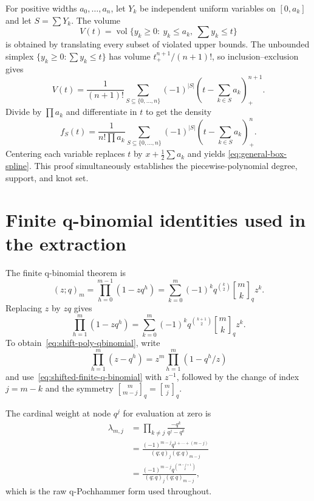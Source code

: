 \documentclass[11pt,a4paper]{article}
\theoremstyle{remark}
\newcommand{\qbinom}[3]{\genfrac{[}{]}{0pt}{}{#1}{#2}_{#3}}
\begin{document}
For positive widths $a_0,\ldots,a_n$, let $Y_k$ be independent uniform
variables on $[0,a_k]$ and let $S=\sum Y_k$.  The volume
\[
 V(t)=\operatorname{vol}\{y_k\ge0:\ y_k\le a_k,\ \sum y_k\le t\}
\]
is obtained by translating every subset of violated upper bounds.  The
unbounded simplex $\{y_k\ge0:\sum y_k\le t\}$ has volume
$t_+^{n+1}/(n+1)!$, so inclusion--exclusion gives
\begin{equation}
 V(t)=\frac1{(n+1)!}\sum_{S\subseteq\{0,\ldots,n\}}
 (-1)^{|S|}\left(t-\sum_{k\in S}a_k\right)_+^{n+1}.
 \label{eq:cdf-box-spline}
\end{equation}
Divide by $\prod a_k$ and differentiate in $t$ to get the density
\begin{equation}
 f_S(t)=\frac1{n!\prod a_k}
 \sum_{S\subseteq\{0,\ldots,n\}}(-1)^{|S|}
 \left(t-\sum_{k\in S}a_k\right)_+^n.
 \label{eq:density-box-spline}
\end{equation}
Centering each variable replaces $t$ by $x+\frac12\sum a_k$ and yields
\eqref{eq:general-box-spline}.  This proof simultaneously establishes the
piecewise-polynomial degree, support, and knot set.

\section{Finite q-binomial identities used in the extraction}
\label{app:q-identities}

The finite q-binomial theorem is
\begin{equation}
 (z;q)_m=\prod_{h=0}^{m-1}(1-zq^h)
 =\sum_{k=0}^{m}(-1)^kq^{\binom k2}
 \qbinom{m}{k}{q}z^k.
 \label{eq:finite-q-binomial-appendix}
\end{equation}
Replacing $z$ by $zq$ gives
\begin{equation}
 \prod_{h=1}^{m}(1-zq^h)
 =\sum_{k=0}^{m}(-1)^kq^{\binom{k+1}{2}}
 \qbinom{m}{k}{q}z^k.
 \label{eq:shifted-finite-q-binomial}
\end{equation}
To obtain~\eqref{eq:shift-poly-qbinomial}, write
\[
 \prod_{h=1}^{m}(z-q^h)
 =z^m\prod_{h=1}^{m}(1-q^h/z)
\]
and use~\eqref{eq:shifted-finite-q-binomial} with $z^{-1}$, followed by the
change of index $j=m-k$ and the symmetry
$\qbinom{m}{m-j}{q}=\qbinom{m}{j}{q}$.

The cardinal weight at node $q^j$ for evaluation at zero is
\begin{align}
 \lambda_{m,j}
 &=\prod_{k\ne j}\frac{-q^k}{q^j-q^k}\\
 &=\frac{(-1)^{m-j}q^{1+\cdots+(m-j)}}
 {(q;q)_j(q;q)_{m-j}}\\
 &=\frac{(-1)^{m-j}q^{\binom{m-j+1}{2}}}
 {(q;q)_j(q;q)_{m-j}},
\end{align}
which is the raw q-Pochhammer form used throughout.
\end{document}
